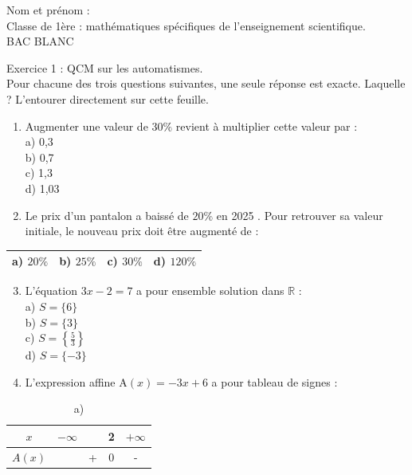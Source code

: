 \documentclass[10pt]{article}
\begin{document}
\captionsetup{singlelinecheck=false}
Nom et prénom :\\
Classe de 1ère : mathématiques spécifiques de l'enseignement scientifique.\\
BAC BLANC

Exercice 1 : QCM sur les automatismes.\\
Pour chacune des trois questions suivantes, une seule réponse est exacte. Laquelle ? L'entourer directement sur cette feuille.

\begin{enumerate}
  \item Augmenter une valeur de $30 \%$ revient à multiplier cette valeur par :\\
a) 0,3\\
b) 0,7\\
c) 1,3\\
d) 1,03
  \item Le prix d'un pantalon a baissé de $20 \%$ en 2025 . Pour retrouver sa valeur initiale, le nouveau prix doit être augmenté de :
\end{enumerate}

\begin{center}
\begin{tabular}{|l|l|l|l|}
\hline
a) $20 \%$ & b) $25 \%$ & c) $30 \%$ & d) $120 \%$ \\
\hline
\end{tabular}
\end{center}

\begin{enumerate}
  \setcounter{enumi}{2}
  \item L'équation $3 x-2=7$ a pour ensemble solution dans $\mathbb{R}$ :\\
a) $S=\{6\}$\\
b) $S=\{3\}$\\
c) $S=\left\{\frac{5}{3}\right\}$\\
d) $S=\{-3\}$
  \item L'expression affine $\mathrm{A}(x)=-3 x+6$ a pour tableau de signes :
\end{enumerate}

\begin{table}[h]
\begin{center}
\captionsetup{labelformat=empty}
\caption{a)}
\begin{tabular}{|c|cccc|}
\hline
$x$ & $-\infty$ &  & 2 & $+\infty$ \\
\hline
$A(x)$ &  & + & 0 & - \\
\hline
\end{tabular}
\end{center}
\end{table}
\end{document}
